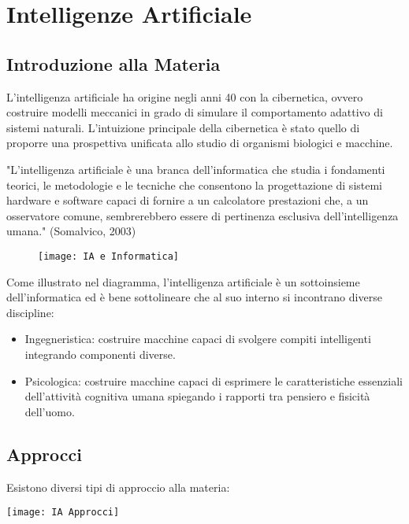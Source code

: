 \section{Intelligenze Artificiale}
\subsection{Introduzione alla Materia}
L'intelligenza artificiale ha origine negli anni 40 con la cibernetica, ovvero costruire modelli meccanici in grado di simulare il comportamento adattivo di sistemi naturali. L’intuizione principale della cibernetica è stato quello di proporre una prospettiva unificata allo studio di organismi biologici e macchine.

"L'intelligenza artificiale è una branca dell’informatica che studia i fondamenti teorici, le metodologie e le tecniche che consentono la progettazione di sistemi hardware e software capaci di fornire a un calcolatore prestazioni che, a un osservatore comune, sembrerebbero essere di pertinenza esclusiva dell’intelligenza umana." (Somalvico, 2003)

\begin{figure}[h]
\texttt{[image: IA e Informatica]}
\centering
\end{figure}

Come illustrato nel diagramma, l'intelligenza artificiale è un sottoinsieme dell'informatica ed è bene sottolineare che al suo interno si incontrano diverse discipline:
\begin{itemize}
    \item Ingegneristica: costruire macchine capaci di svolgere compiti intelligenti integrando componenti diverse.
    \item Psicologica: costruire macchine capaci di esprimere le caratteristiche essenziali dell’attività cognitiva umana spiegando i rapporti tra pensiero e fisicità dell’uomo.
\end{itemize}

\subsection{Approcci}

Esistono diversi tipi di approccio alla materia:

\texttt{[image: IA Approcci]}

